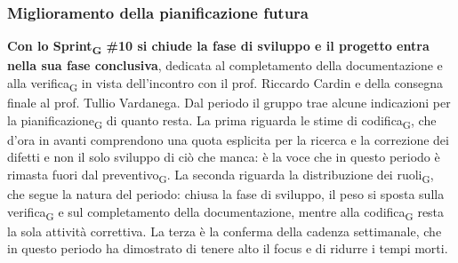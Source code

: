 ﻿\documentclass[a4paper, 10pt, colorlinks=true, linkcolor=black, urlcolor=blue, citecolor=blue, hidelinks]{article}
\begin{document}
\subsubsection{Miglioramento della pianificazione futura}
\textbf{Con lo Sprint\textsubscript{G} \#10 si chiude la fase di sviluppo e il progetto entra nella sua fase conclusiva}, dedicata al completamento della documentazione e alla verifica\textsubscript{G} in vista dell'incontro con il prof. Riccardo Cardin e della consegna finale al prof. Tullio Vardanega.
Dal periodo il gruppo trae alcune indicazioni per la pianificazione\textsubscript{G} di quanto resta. La prima riguarda le stime di codifica\textsubscript{G}, che d'ora in avanti comprendono una quota esplicita per la ricerca e la correzione dei difetti e non il solo sviluppo di ciò che manca: è la voce che in questo periodo è rimasta fuori dal preventivo\textsubscript{G}. La seconda riguarda la distribuzione dei ruoli\textsubscript{G}, che segue la natura del periodo: chiusa la fase di sviluppo, il peso si sposta sulla verifica\textsubscript{G} e sul completamento della documentazione, mentre alla codifica\textsubscript{G} resta la sola attività correttiva. La terza è la conferma della cadenza settimanale, che in questo periodo ha dimostrato di tenere alto il focus e di ridurre i tempi morti.
\end{document}
